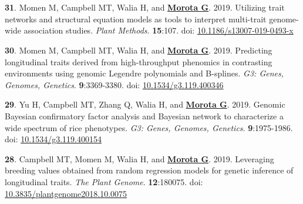 \documentclass[margin,line,10pt]{res}
\newenvironment{list1}{
  \begin{list}{\ding{113}}{%
      \setlength{\itemsep}{0in}
      \setlength{\parsep}{0in} \setlength{\parskip}{0in}
      \setlength{\topsep}{0in} \setlength{\partopsep}{0in} 
      \setlength{\leftmargin}{0.17in}}}{\end{list}}
\begin{document}
\begin{resume}
\begin{list1}
  \end{list1}


\section{}
\begin{list1}
  
\item  [{\bf 31}.] Momen M, Campbell MT, Walia H, and \textbf{\underline{Morota G}}. 2019. Utilizing trait networks and structural equation models as tools to interpret multi-trait genome-wide association studies. \emph{Plant Methods}. \textbf{15}:107. doi: \textcolor{blue}{\href{https://doi.org/10.1186/s13007-019-0493-x}{10.1186/s13007-019-0493-x}}

     \vspace{0.5cm}
     
\item  [{\bf 30}.]  Momen M, Campbell MT, Walia H, and \textbf{\underline{Morota G}}. 2019. Predicting longitudinal traits derived from high-throughput phenomics in contrasting environments using genomic Legendre polynomials and B-splines. \emph{G3: Genes, Genomes, Genetics}. \textbf{9}:3369-3380.  doi: \textcolor{blue}{\href{https://doi.org/10.1534/g3.119.400346}{10.1534/g3.119.400346}}

     \vspace{0.5cm}

\item  [{\bf 29}.] Yu H, Campbell MT, Zhang Q, Walia H, and \textbf{\underline{Morota G}}. 2019. Genomic Bayesian confirmatory factor analysis and Bayesian network to characterize a wide spectrum of rice phenotypes. \emph{G3: Genes, Genomes, Genetics}. \textbf{9}:1975-1986. doi: \textcolor{blue}{\href{https://doi.org/10.1534/g3.119.400154}{10.1534/g3.119.400154}}

  \vspace{0.5cm}
  
\item  [{\bf 28}.] Campbell MT, Momen M, Walia H, and \textbf{\underline{Morota G}}. 2019. Leveraging breeding values obtained from random regression models for genetic inference of longitudinal traits. \emph{The Plant Genome}. \textbf{12}:180075. doi: \textcolor{blue}{\href{https://doi.org/10.3835/plantgenome2018.10.0075}{10.3835/plantgenome2018.10.0075}}

\end{list1}


\section{}
\begin{list1}


\end{list1}
\end{resume}
\end{document}
